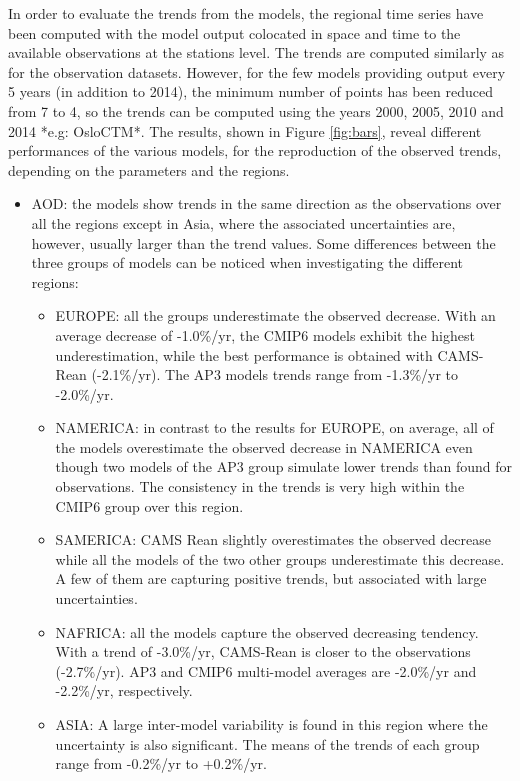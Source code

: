 \documentclass[journal abbreviation, manuscript]{copernicus}
\begin{document}
In order to evaluate the trends from the models, the regional time series have been computed with the model output colocated in space and time to the available observations at the stations level. The trends are computed similarly as for the observation datasets. However, for the few models providing output every 5 years (in addition to 2014), the minimum number of points has been reduced from 7 to 4, so the trends can be computed using the years 2000, 2005, 2010 and 2014 *e.g: OsloCTM*. The results, shown in Figure \ref{fig:bars}, reveal different performances of the various models, for the reproduction of the observed trends, depending on the parameters and the regions.


\begin{itemize}
 \item AOD: the models show trends in the same direction as the observations over all the regions except in Asia, where the associated uncertainties are, however, usually larger than the trend values. Some differences between the three groups of models can be noticed when investigating the different regions:
       \begin{itemize}
        \item EUROPE: all the groups underestimate the observed decrease. With an average decrease of -1.0\%/yr, the CMIP6 models exhibit the highest underestimation, while the best performance is obtained with CAMS-Rean (-2.1\%/yr). The AP3 models trends range from -1.3\%/yr to -2.0\%/yr.
        \item NAMERICA: in contrast to the results for EUROPE, on average, all of the models overestimate the observed decrease in NAMERICA even though two models of the AP3 group simulate lower trends than found for observations. The consistency in the trends is very high within the CMIP6 group over this region.
        \item SAMERICA: CAMS Rean slightly overestimates the observed decrease while all the models of the two other groups underestimate this decrease. A few of them are capturing positive trends, but associated with large uncertainties.
        \item NAFRICA: all the models capture the observed decreasing tendency. With a trend of -3.0\%/yr, CAMS-Rean is closer to the observations (-2.7\%/yr). AP3 and CMIP6 multi-model averages are -2.0\%/yr and -2.2\%/yr, respectively.
        \item ASIA: A large inter-model variability is found in this region where the uncertainty is also significant. The means of the trends of each group range from -0.2\%/yr to +0.2\%/yr.

\end{itemize}
\end{itemize}
\end{document}
